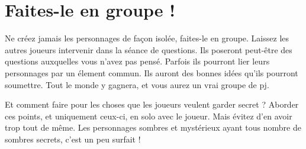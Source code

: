 \section{Faites-le en groupe !}

Ne créez jamais les personnages de façon isolée, faites-le en groupe. Laissez les autres joueurs intervenir dans la séance de questions. Ils poseront peut-être des questions auxquelles vous n'avez pas pensé. Parfois ils pourront lier leurs personnages par un élement commun. Ils auront des bonnes idées qu'ils pourront soumettre. Tout le monde y gagnera, et vous aurez un vrai groupe de pj.

Et comment faire pour les choses que les joueurs veulent garder secret ? Aborder ces points, et uniquement ceux-ci, en solo avec le joueur. Mais évitez d'en avoir trop tout de même. Les personnages sombres et mystérieux ayant tous nombre de sombres secrets, c'est un peu surfait !

